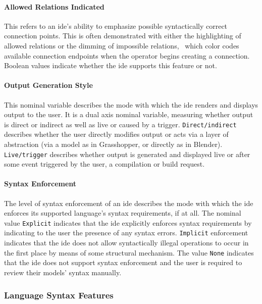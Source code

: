 \paragraph{Allowed Relations Indicated}
This refers to an \ac{ide}'s ability to
emphasize possible syntactically correct connection points. This is often
demonstrated with either the highlighting of allowed relations or the
dimming of impossible relations, \eg \cameleon~which color codes available
connection endpoints when the operator begins creating a connection.
Boolean values indicate whether the \ac{ide} supports this feature or not.


\paragraph{Output Generation Style}
This nominal variable describes the
mode with which the \ac{ide} renders and displays output to the user. It is a
dual axis nominal variable, measuring whether output is direct or indirect
as well as live or caused by a trigger. \texttt{Direct/indirect} describes
whether the user directly modifies output or acts via a layer of
abstraction (\eg via a model as in Grasshopper, or directly as in Blender).
\texttt{Live/trigger} describes whether output is generated and displayed
live or after some event triggered by the user, \eg a compilation or build
request.


\paragraph{Syntax Enforcement}
The level of syntax enforcement of an \ac{ide} describes the mode with
which the \ac{ide} enforces its supported language's syntax requirements,
if at all.
The nominal value \texttt{Explicit}
indicates that the \ac{ide} explicitly enforces syntax requirements by
indicating to the user the presence of any syntax errors. \texttt{Implicit}
enforcement indicates that the \ac{ide} does not allow syntactically illegal
operations to occur in the first place by means of some structural
mechanism. The value \texttt{None} indicates that the \ac{ide} does not support
syntax enforcement and the user is required to review their models' syntax
manually.


\subsubsection{Language Syntax Features} \label{subsubsec:languagesyntax}


